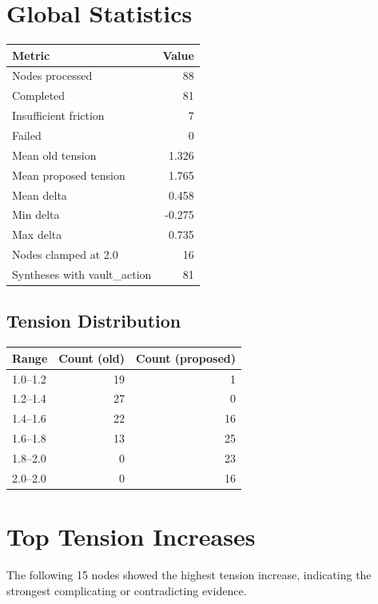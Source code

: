\documentclass[11pt,a4paper]{article}
\begin{document}
\section{Global Statistics}

\begin{tabular}{lr}
\toprule
Metric & Value \\
\midrule
Nodes processed & 88 \\
Completed & 81 \\
Insufficient friction & 7 \\
Failed & 0 \\
Mean old tension & 1.326 \\
Mean proposed tension & 1.765 \\
Mean delta & 0.458 \\
Min delta & -0.275 \\
Max delta & 0.735 \\
Nodes clamped at 2.0 & 16 \\
Syntheses with vault\_action & 81 \\
\bottomrule
\end{tabular}

\subsection{Tension Distribution}
\begin{tabular}{lrr}
\toprule
Range & Count (old) & Count (proposed) \\
\midrule
1.0--1.2 & 19 & 1 \\
1.2--1.4 & 27 & 0 \\
1.4--1.6 & 22 & 16 \\
1.6--1.8 & 13 & 25 \\
1.8--2.0 & 0 & 23 \\
2.0--2.0 & 0 & 16 \\
\bottomrule
\end{tabular}

\section{Top Tension Increases}
The following 15 nodes showed the highest tension increase, indicating the strongest complicating or contradicting evidence.
\end{document}
